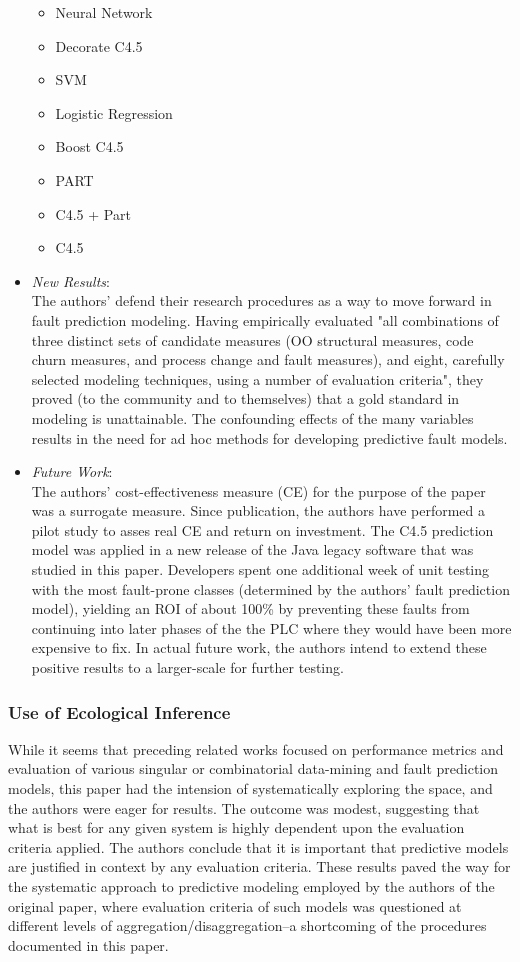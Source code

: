 \documentclass{sig-alternate-05-2015}
\begin{document}
\begin{itemize}
\begin{itemize}
		\item Neural Network
		\item Decorate C4.5
		\item SVM
		\item Logistic Regression
		\item Boost C4.5
		\item PART
		\item C4.5 + Part
		\item C4.5
	\end{itemize}
\item \emph{New Results}: \\
The authors' defend their research procedures as a way to move forward in fault prediction modeling. Having empirically evaluated "all combinations of three distinct sets of candidate measures (OO structural measures, code churn measures, and process change and fault measures), and eight, carefully selected modeling techniques, using a number of evaluation criteria", they proved (to the community and to themselves) that a gold standard in modeling is unattainable. The confounding effects of the many variables results in the need for ad hoc methods for developing predictive fault models.
\item \emph{Future Work}: \\
The authors' cost-effectiveness measure (CE) for the purpose of the paper was a surrogate measure. Since publication, the authors have performed a pilot study to asses real CE and return on investment. The C4.5 prediction model was applied in a new release of the Java legacy software that was studied in this paper. Developers spent one additional week of unit testing with the most fault-prone classes (determined by the authors' fault prediction model), yielding an ROI of about 100\% by preventing these faults from continuing into later phases of the the PLC where they would have been more expensive to fix. In actual future work, the authors intend to extend these positive results to a larger-scale for further testing.

\end{itemize}

\subsubsection{Use of Ecological Inference}
While it seems that preceding related works focused on performance metrics and evaluation of various singular or combinatorial data-mining and fault prediction models, this paper had the intension of systematically exploring the space, and the authors were eager for results. The outcome was modest, suggesting that what is best for any given system is highly dependent upon the evaluation criteria applied. The authors conclude that it is important that predictive models are justified in context by any evaluation criteria. These results paved the way for the systematic approach to predictive modeling employed by the authors of the original paper, where evaluation criteria of such models was questioned at different levels of aggregation/disaggregation--a shortcoming of the procedures documented in this paper.
\end{document}
